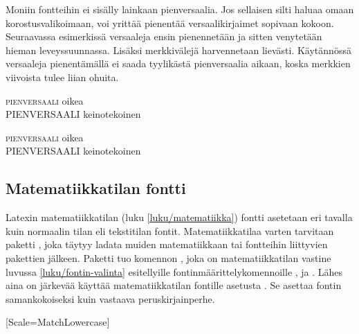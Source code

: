 Moniin fontteihin ei sisälly lainkaan pienversaalia. Jos sellaisen silti
haluaa omaan korostusvalikoimaan, voi yrittää pienentää
versaalikirjaimet sopivaan kokoon. Seuraavassa esimerkissä versaaleja
ensin pienennetään ja sitten venytetään hieman leveyssuunnassa. Lisäksi
merkkivälejä harvennetaan lievästi. Käytännössä versaaleja pienentämällä
ei saada tyylikästä pienversaalia aikaan, koska merkkien viivoista tulee
liian ohuita.

\begin{koodilohkosis}
\textsc{pienversaali} oikea \\
{
  PIENVERSAALI} keinotekoinen
\end{koodilohkosis}

\begin{tulossis}
  \textsc{pienversaali} oikea \\
  {
    PIENVERSAALI} keinotekoinen
\end{tulossis}

\subsection{Matematiikkatilan fontti}
\label{luku/matematiikka-fontit}

Latexin matematiikkatilan (luku \ref{luku/matematiikka}) fontti
asetetaan eri tavalla kuin normaalin tilan eli tekstitilan fontit.
Matematiikkatilaa varten tarvitaan paketti ,
joka täytyy ladata muiden matematiikkaan tai fontteihin liittyvien
pakettien jälkeen. Paketti tuo komennon , joka on
matematiikkatilan vastine luvussa \ref{luku/fontin-valinta} esitellyille
fontinmäärittelykomennoille , 
ja . Lähes aina on järkevää käyttää
matematiikkatilan fontille asetusta .
Se asettaa fontin samankokoiseksi kuin vastaava peruskirjainperhe.

\begin{koodilohkosis}
\usepackage{fontspec}
\usepackage{unicode-math}
\setmainfont{TeX Gyre Pagella}     %
[Scale=MatchLowercase]
\end{koodilohkosis}

